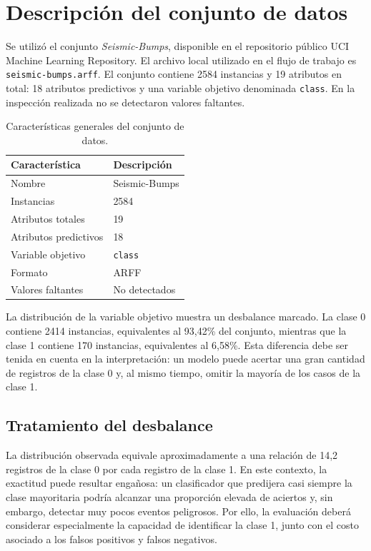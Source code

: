 \documentclass[12pt,a4paper]{article}
\begin{document}
\section{Descripción del conjunto de datos}
Se utilizó el conjunto \textit{Seismic-Bumps}, disponible en el repositorio público UCI Machine Learning Repository. El archivo local utilizado en el flujo de trabajo es \texttt{seismic-\allowbreak bumps.arff}. El conjunto contiene 2584 instancias y 19 atributos en total: 18 atributos predictivos y una variable objetivo denominada \texttt{class}. En la inspección realizada no se detectaron valores faltantes.

\begin{table}[H]
\centering
\caption{Características generales del conjunto de datos.}
\label{tab:dataset-general}
\begin{tabular}{ll}
\toprule
\textbf{Característica} & \textbf{Descripción} \\
\midrule
Nombre & Seismic-Bumps \\
Instancias & 2584 \\
Atributos totales & 19 \\
Atributos predictivos & 18 \\
Variable objetivo & \texttt{class} \\
Formato & ARFF \\
Valores faltantes & No detectados \\
\bottomrule
\end{tabular}
\end{table}

La distribución de la variable objetivo muestra un desbalance marcado. La clase 0 contiene 2414 instancias, equivalentes al 93,42\% del conjunto, mientras que la clase 1 contiene 170 instancias, equivalentes al 6,58\%. Esta diferencia debe ser tenida en cuenta en la interpretación: un modelo puede acertar una gran cantidad de registros de la clase 0 y, al mismo tiempo, omitir la mayoría de los casos de la clase 1.

\subsection{Tratamiento del desbalance}
La distribución observada equivale aproximadamente a una relación de 14,2 registros de la clase 0 por cada registro de la clase 1. En este contexto, la exactitud puede resultar engañosa: un clasificador que predijera casi siempre la clase mayoritaria podría alcanzar una proporción elevada de aciertos y, sin embargo, detectar muy pocos eventos peligrosos. Por ello, la evaluación deberá considerar especialmente la capacidad de identificar la clase 1, junto con el costo asociado a los falsos positivos y falsos negativos.
\end{document}
